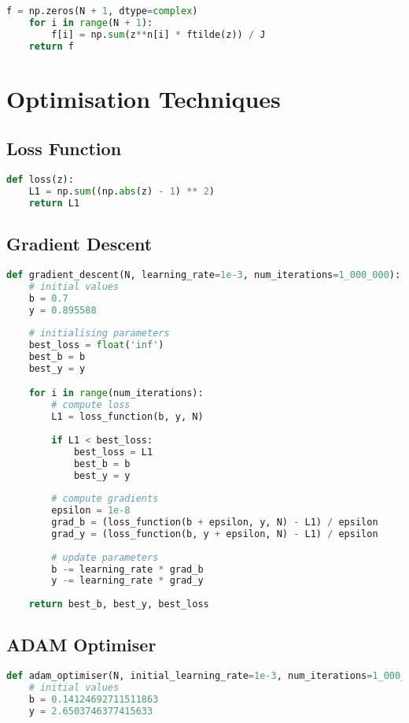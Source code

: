 \begin{appendices}
\begin{lstlisting}[language=Python, caption= null]
    f = np.zeros(N + 1, dtype=complex)
    for i in range(N + 1):
        f[i] = np.sum(z**n[i] * ftilde(z)) / J
    return f
\end{lstlisting}

\newpage
\section{Optimisation Techniques}

\subsection{Loss Function}
\begin{lstlisting}[language=Python, caption= null]
def loss(z):
    L1 = np.sum((np.abs(z) - 1) ** 2)
    return L1
\end{lstlisting}

\subsection{Gradient Descent}
\begin{lstlisting}[language=Python, caption= null]
def gradient_descent(N, learning_rate=1e-3, num_iterations=1_000_000):
	# initial values
    b = 0.7
    y = 0.895588
    
    # initialising parameters
    best_loss = float('inf')
    best_b = b
    best_y = y

    for i in range(num_iterations):
        # compute loss
        L1 = loss_function(b, y, N)
        
        if L1 < best_loss:
            best_loss = L1
            best_b = b
            best_y = y
        
        # compute gradients 
        epsilon = 1e-8
        grad_b = (loss_function(b + epsilon, y, N) - L1) / epsilon
        grad_y = (loss_function(b, y + epsilon, N) - L1) / epsilon
        
        # update parameters
        b -= learning_rate * grad_b
        y -= learning_rate * grad_y
    
    return best_b, best_y, best_loss
\end{lstlisting}

\subsection{ADAM Optimiser}
\begin{lstlisting}[language=Python, caption= null]
def adam_optimiser(N, initial_learning_rate=1e-3, num_iterations=1_000_000, beta1=0.9, beta2=0.999, epsilon=1e-5):
	# initial values
    b = 0.14124692711511863
    y = 2.6503746377415633


\end{lstlisting}
\end{appendices}
